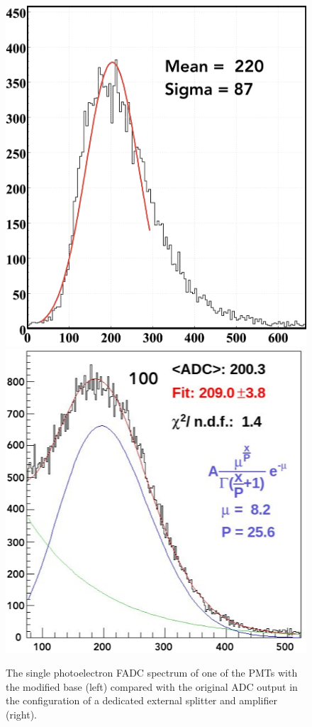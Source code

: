 \begin{figure}[H]
	\centering
	\includegraphics[width=0.47\columnwidth,height=0.7\columnwidth]{img/fadcOutput.png}
	\includegraphics[width=0.47\columnwidth,height=0.7\columnwidth]{img/cc_signal.png}
	\caption{The single photoelectron FADC spectrum of one of the PMTs with the modified base (left) compared with
          the original ADC output in the configuration of a dedicated external splitter and amplifier (right). }
	\label{fig:dividerTests}
\end{figure}


